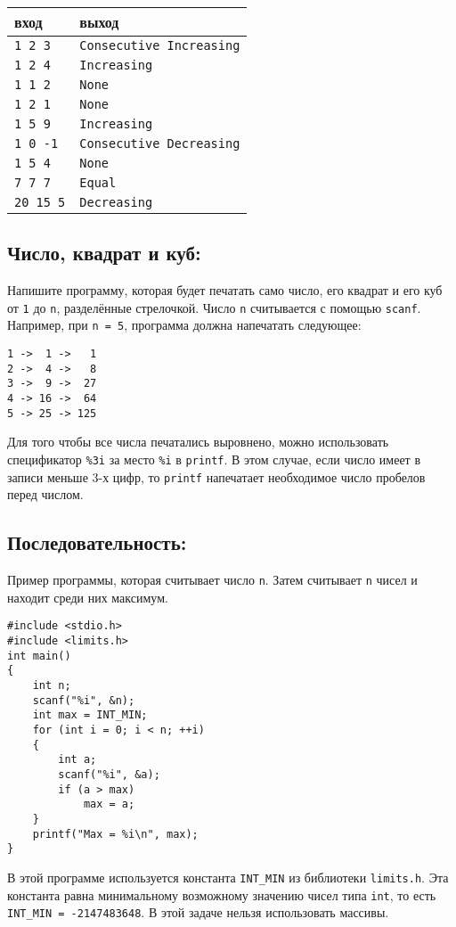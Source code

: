 \documentclass{article}
\begin{document}
\begin{center}
\begin{tabular}{ l l }
 вход & выход \\ \hline
 \texttt{1 2 3} & \texttt{Consecutive Increasing}  \\ 
 \texttt{1 2 4} & \texttt{Increasing}  \\
 \texttt{1 1 2} & \texttt{None} \\ 
 \texttt{1 2 1} & \texttt{None} \\ 
 \texttt{1 5 9} & \texttt{Increasing}  \\ 
 \texttt{1 0 -1} & \texttt{Consecutive Decreasing}  \\ 
 \texttt{1 5 4} & \texttt{None} \\ 
 \texttt{7 7 7} & \texttt{Equal} \\  
 \texttt{20 15 5} & \texttt{Decreasing} \\
\end{tabular}
\end{center}


\subsection{Число, квадрат и куб:} 
Напишите программу, которая будет печатать само число, его квадрат и его куб от \texttt{1} до \texttt{n}, разделённые стрелочкой.
Число \texttt{n} считывается с помощью \texttt{scanf}. 
Например, при \texttt{n = 5}, программа должна напечатать следующее:
\begin{verbatim}
1 ->  1 ->   1
2 ->  4 ->   8
3 ->  9 ->  27
4 -> 16 ->  64
5 -> 25 -> 125
\end{verbatim}
Для того чтобы все числа печатались выровнено, можно использовать спецификатор \texttt{\%3i} за место \texttt{\%i} в \texttt{printf}. В этом случае, если число имеет в записи меньше 3-х цифр, то \texttt{printf} напечатает необходимое число пробелов перед числом.



\subsection{Последовательность:} 
Пример программы, которая считывает число \texttt{n}. Затем считывает \texttt{n} чисел и находит среди них максимум. 

\begin{lstlisting}
#include <stdio.h>
#include <limits.h>
int main() 
{
    int n;
    scanf("%i", &n);
    int max = INT_MIN;
    for (int i = 0; i < n; ++i) 
    {
        int a;
        scanf("%i", &a);
        if (a > max)
            max = a;
    }
    printf("Max = %i\n", max);
}
\end{lstlisting}
В этой программе используется константа \texttt{INT\_MIN} из библиотеки \texttt{limits.h}. Эта константа равна минимальному возможному значению чисел типа \texttt{int}, то есть \texttt{INT\_MIN = -2147483648}. В этой задаче нельзя использовать массивы.
\end{document}
